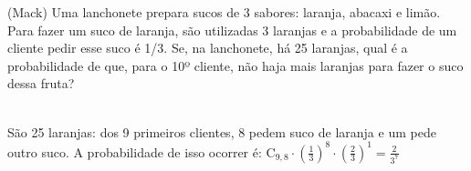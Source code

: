 \begin{ex}
(Mack) Uma lanchonete prepara sucos de 3 sabores: laranja, abacaxi e limão. Para fazer um suco de laranja, são utilizadas 3 laranjas e a probabilidade de um cliente pedir esse suco é 1/3. Se, na lanchonete, há 25 laranjas, qual é a probabilidade de que, para o 10º cliente, não haja mais laranjas para fazer o suco dessa fruta?
  \begin{sol}
    \phantom{A} \\
    São 25 laranjas: dos 9 primeiros clientes, 8 pedem suco de laranja e um pede outro suco. A probabilidade de isso ocorrer  é: 
    $\mathrm{C}_{9,8}\cdot(\frac{1}{3})^8\cdot(\frac{2}{3})^1=\frac{2}{3^7}$
  \end{sol}
\end{ex}